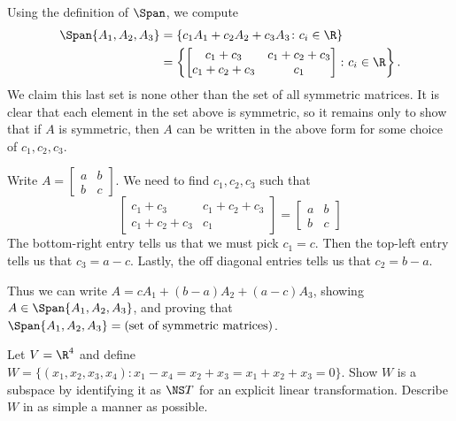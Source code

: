 \begin{solution}
Using the definition of $\Span$, we compute 
\begin{align*}
\Span\{A_1,A_2,A_3\}&=\{c_1A_1+c_2A_2+c_3A_3\colon c_i\in\R\} \\
&=\left\{\begin{bmatrix} c_1+c_3&c_1+c_2+c_3\\ c_1+c_2+c_3 & c_1\end{bmatrix}\colon c_i\in\R\right\}.
\end{align*}
We claim this last set is none other than the set of all symmetric matrices. It is clear that each element in the set above is symmetric, so it remains only to show that if $A$ is symmetric, then $A$ can be written in the above form for some choice of $c_1,c_2,c_3$. 

Write $A=\begin{bmatrix}a&b\\b&c \end{bmatrix}$. We need to find $c_1,c_2,c_3$ such that 
\[
\begin{bmatrix} c_1+c_3&c_1+c_2+c_3\\ c_1+c_2+c_3 & c_1\end{bmatrix}=\begin{bmatrix}a&b\\b&c \end{bmatrix}
\]
The bottom-right entry tells us that we must pick $c_1=c$. Then the top-left entry tells us that $c_3=a-c$. Lastly, the off diagonal entries tells us that $c_2=b-a$. 

Thus we can write $A=cA_1+(b-a)A_2+(a-c)A_3$, showing $A\in\Span\{A_1,A_2,A_3\}$, and proving that $\Span\{A_1,A_2,A_3\}=(\text{set of symmetric matrices)}$. 
\end{solution}
\ii Let $V=\R^4$ and define $W=\{(x_1,x_2,x_3,x_4)\colon x_1-x_4=x_2+x_3=x_1+x_2+x_3=0\}$. 
\bb
\ii Show $W$ is a subspace by identifying it as $\NS T$ for an explicit linear transformation. 
\ii Describe $W$ in as simple a manner as possible. 
\ee
